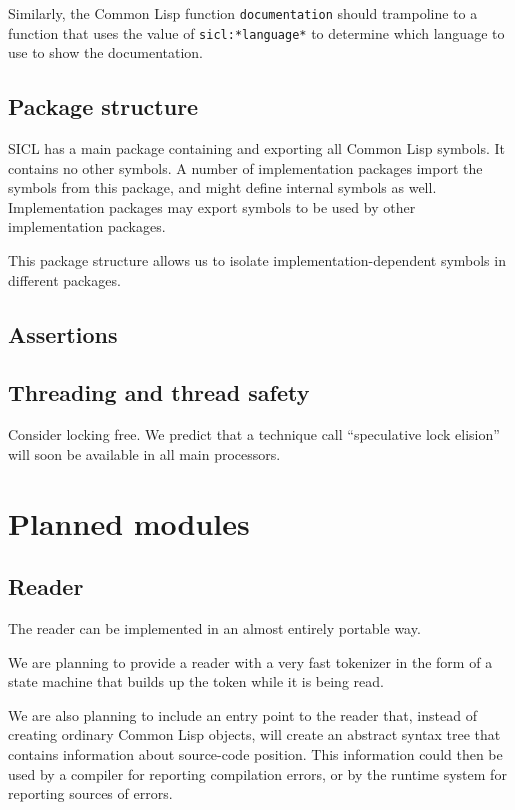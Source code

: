 \documentclass{article}
\def\sysname{SICL}
\begin{document}
Similarly, the Common Lisp function \texttt{documentation} should
trampoline to a function that uses the value of
\texttt{sicl:*language*} to determine which language to use to show
the documentation. 

\subsection{Package structure}

{\sysname} has a main package containing and exporting all Common Lisp
symbols.  It contains no other symbols.  A number of implementation
packages import the symbols from this package, and might define
internal symbols as well.  Implementation packages may export symbols
to be used by other implementation packages.

This package structure allows us to isolate implementation-dependent
symbols in different packages.  

\subsection{Assertions}

\subsection{Threading and thread safety}

Consider locking free.  We predict that a technique call ``speculative
lock elision'' will soon be available in all main processors. 

\section{Planned modules}

\subsection{Reader}

The reader can be implemented in an almost entirely portable way.  

We are planning to provide a reader with a very fast tokenizer in the
form of a state machine that builds up the token while it is being
read.  

We are also planning to include an entry point to the reader that,
instead of creating ordinary Common Lisp objects, will create an
abstract syntax tree that contains information about source-code
position.  This information could then be used by a compiler for
reporting compilation errors, or by the runtime system for reporting
sources of errors. 
\end{document}

